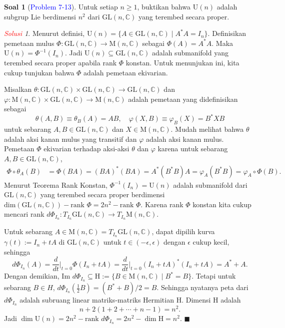 \documentclass[11pt]{article}
\theoremstyle{definition}
\newtheorem*{problem}{Soal}
\theoremstyle{remark}
\newtheorem*{solution}{\textcolor{red}{Solusi}}
\newcommand{\Mnc}{\text{M}(n,\mathbb{C})}   %
\newcommand{\GL}{\text{GL}}                 %
\newcommand{\GLnc}{\text{GL}(n,\mathbb{C})} %
\newcommand{\Un}{\text{U}(n)}               %
\newcommand{\image}{\text{Im }}             %
\newcommand{\rank}{\text{rank }}            %
\begin{document}
\begin{problem}[\textcolor{blue}{Problem 7-13}] 
Untuk setiap $n \geq 1$, buktikan bahwa $\text{U}(n)$ adalah subgrup Lie berdimensi $n^2$ dari $\GL(n,\mathbb{C})$ yang terembed secara proper.
\end{problem}
\begin{solution}
Menurut definisi, $\Un = \{ A \in \GLnc \mid A^*A = I_n \}$. Definisikan pemetaan mulus $\Phi : \GLnc \to \Mnc$ sebagai $\Phi(A) = A^*A$. Maka $\Un = \Phi^{-1}(I_n)$. Jadi $\Un \subseteq \GLnc$ adalah submanifold yang terembed secara proper apabila rank $\Phi$ konstan. Untuk menunjukan ini, kita cukup tunjukan bahwa $\Phi$ adalah pemetaan ekivarian.

Misalkan $\theta : \GLnc \times \GLnc \to \GLnc$ dan $\varphi : \Mnc \times \GLnc \to \Mnc$ adalah pemetaan yang didefinisikan sebagai
$$
\theta(A,B) \equiv \theta_B(A) =  AB,\quad \varphi(X,B) \equiv \varphi_B(X) = B^*XB
$$
untuk sebarang $A,B \in \GLnc$ dan $X \in \Mnc$. Mudah melihat bahwa $\theta$ adalah aksi kanan mulus yang transitif dan $\varphi$ adalah aksi kanan mulus. Pemetaan $\Phi$ ekivarian terhadap aksi-aksi $\theta$ dan $\varphi$ karena untuk sebarang $A,B \in \GLnc$,
\begin{align*}
    \Phi \circ \theta_A (B) &= \Phi(BA) = (BA)^*(BA) = A^*(B^*B)A = \varphi_A(B^*B) = \varphi_A \circ \Phi (B).
\end{align*}
Menurut Teorema Rank Konstan, $\Phi^{-1}(I_n) = \Un$ adalah submanifold dari $\GLnc$ yang terembed secara proper berdimensi $\text{dim}(\GLnc) - \rank \Phi = 2n^2 - \rank \Phi$. Karena rank $\Phi$ konstan kita cukup mencari rank $d\Phi_{I_n} : T_{I_n}\GLnc \to T_{I_n}\Mnc$. 

Untuk sebarang $A \in \Mnc = T_{I_n}\GLnc$, dapat dipilih kurva $\gamma(t):=I_n + tA$ di $\GLnc$ untuk $t \in (-\epsilon,\epsilon)$ dengan $\epsilon$ cukup kecil, sehingga
$$
d\Phi_{I_n}(A) = \frac{d}{dt}\Big|_{t=0} \Phi (I_n + tA) = \frac{d}{dt}\Big|_{t=0} (I_n+tA)^* (I_n+tA) = A^*+A.
$$
Dengan demikian, $\image d\Phi_{I_n} \subseteq \text{H}:=\{ B \in \Mnc \mid B^*=B \}$. Tetapi untuk sebarang $B \in H$, $d\Phi_{I_n}(\frac{1}{2}B) = (B^*+B)/2 = B$. Sehingga nyatanya peta dari $d\Phi_{I_n}$ adalah subruang linear matriks-matriks Hermitian $\text{H}$. Dimensi $\text{H}$ adalah
$$
n + 2(1+2+\cdots+n-1) = n^2.
$$
Jadi $\dim \Un = 2n^2 - \rank d\Phi_{I_n} = 2n^2- \dim \text{H} = n^2$. $\blacksquare$
\end{solution}
\end{document}
